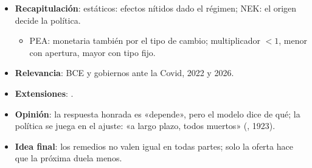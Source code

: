\documentclass{article}
\begin{document}
\begin{columnas}
\begin{itemize}
\item \textbf{Recapitulación}: estáticos: efectos nítidos dado el régimen; NEK: el origen decide la política.
  \begin{itemize}
  \item PEA: monetaria también por el tipo de cambio; multiplicador $<1$, menor con apertura, mayor con tipo fijo.
  \end{itemize}
\item \textbf{Relevancia}: BCE y gobiernos ante la Covid, 2022 y 2026.
\item \textbf{Extensiones}:     .
\item \textbf{Opinión}: la respuesta honrada es «depende», pero el modelo dice de qué; la política se juega en el ajuste: «a largo plazo, todos muertos» (, 1923).
\item \textbf{Idea final}: los remedios no valen igual en todas partes; solo la oferta hace que la próxima duela menos.
\end{itemize}


\end{columnas}
\end{document}
